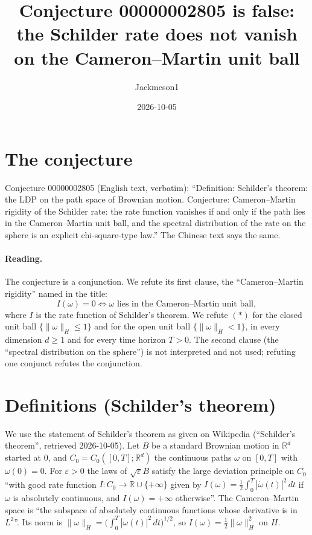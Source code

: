 \documentclass[11pt]{article}
\title{Conjecture 00000002805 is false:\\ the Schilder rate does not vanish on the Cameron--Martin unit ball}
\author{Jackmeson1}
\date{2026-10-05}
\theoremstyle{definition}
\begin{document}
\maketitle

\section{The conjecture}
Conjecture 00000002805 (English text, verbatim): ``Definition: Schilder's theorem: the LDP on
the path space of Brownian motion. Conjecture: Cameron--Martin rigidity of the Schilder rate: the
rate function vanishes if and only if the path lies in the Cameron--Martin unit ball, and the
spectral distribution of the rate on the sphere is an explicit chi-square-type law.'' The Chinese
text says the same.

\paragraph{Reading.} The conjecture is a conjunction. We refute its first clause, the
``Cameron--Martin rigidity'' named in the title:
\[ I(\omega)=0 \iff \omega \text{ lies in the Cameron--Martin unit ball}, \tag{$\ast$}\]
where $I$ is the rate function of Schilder's theorem. We refute $(\ast)$ for the closed unit ball
$\{\|\omega\|_H\le 1\}$ and for the open unit ball $\{\|\omega\|_H<1\}$, in every dimension
$d\ge 1$ and for every time horizon $T>0$. The second clause (the ``spectral distribution on the
sphere'') is not interpreted and not used; refuting one conjunct refutes the conjunction.

\section{Definitions (Schilder's theorem)}
We use the statement of Schilder's theorem as given on Wikipedia (``Schilder's theorem'', retrieved
2026-10-05). Let $B$ be a standard Brownian motion in $\mathbb R^d$ started at $0$, and
$C_0=C_0([0,T];\mathbb R^d)$ the continuous paths $\omega$ on $[0,T]$ with $\omega(0)=0$. For
$\varepsilon>0$ the laws of $\sqrt\varepsilon B$ satisfy the large deviation principle on $C_0$
``with good rate function $I : C_0 \to \mathbb R\cup\{+\infty\}$ given by
$I(\omega)=\frac12\int_0^T|\dot\omega(t)|^2\,dt$ if $\omega$ is absolutely continuous, and
$I(\omega)=+\infty$ otherwise''. The Cameron--Martin space is ``the subspace of absolutely
continuous functions whose derivative is in $L^2$''. Its norm is
$\|\omega\|_H=\big(\int_0^T|\dot\omega(t)|^2\,dt\big)^{1/2}$, so $I(\omega)=\frac12\|\omega\|_H^2$
on $H$.
\end{document}
